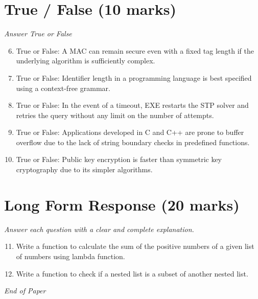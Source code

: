 \documentclass[12pt]{article}
\begin{document}
\section*{True / False (10 marks)}
\textit{Answer True or False}
\begin{enumerate}[label=\arabic*.]
\setcounter{enumi}{5}
\item True or False: A MAC can remain secure even with a fixed tag length if the underlying algorithm is sufficiently complex.
\item True or False: Identifier length in a programming language is best specified using a context-free grammar.
\item True or False: In the event of a timeout, EXE restarts the STP solver and retries the query without any limit on the number of attempts.
\item True or False: Applications developed in C and C++ are prone to buffer overflow due to the lack of string boundary checks in predefined functions.
\item True or False: Public key encryption is faster than symmetric key cryptography due to its simpler algorithms.
\end{enumerate}

\section*{Long Form Response (20 marks)}
\textit{Answer each question with a clear and complete explanation.}
\begin{enumerate}[label=\arabic*.]
\setcounter{enumi}{10}
\item Write a function to calculate the sum of the positive numbers of a given list of numbers using lambda function.
\item Write a function to check if a nested list is a subset of another nested list.
\end{enumerate}

\vfill
\noindent\textit{End of Paper}
\end{document}
